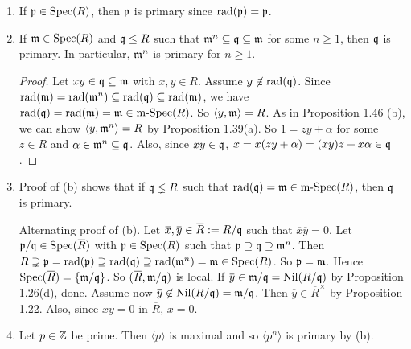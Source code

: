 \begin{example}
    \begin{enumerate}
        \item 
            If $\mathfrak{p} \in \operatorname{Spec}(R)$, then $\mathfrak{p}$ is primary since $\operatorname{rad}(\mathfrak{p}) = \mathfrak{p}$.
        \item 
            If $\mathfrak{m} \in \operatorname{Spec}(R)$ and $\mathfrak{q} \leq R$ such that $\mathfrak{m}^{n} \subseteq \mathfrak{q} \subseteq \mathfrak{m}$ for some $n \geq 1$, then $\mathfrak{q}$ is primary. In particular, $\mathfrak{m}^{n}$ is primary for $n \geq 1$.
            \begin{proof}
                Let $xy \in \mathfrak{q} \subseteq \mathfrak{m}$ with $x,y \in R$. Assume $y \not\in \operatorname{rad}(\mathfrak{q})$. Since $\operatorname{rad}(\mathfrak{m}) = \operatorname{rad}(\mathfrak{m}^{n}) \subseteq \operatorname{rad}(\mathfrak{q}) \subseteq \operatorname{rad}(\mathfrak{m})$, we have $\operatorname{rad}(\mathfrak{q}) = \operatorname{rad}(\mathfrak{m}) = \mathfrak{m} \in \operatorname{m-Spec}(R)$. So $\langle y,\mathfrak{m} \rangle = R$. As in Proposition 1.46 (b), we can show $\langle y,\mathfrak{m}^{n} \rangle = R$ by Proposition 1.39(a). So $1 = zy + \alpha$ for some $z \in R$ and $\alpha \in \mathfrak{m}^{n} \subseteq \mathfrak{q}$. Also, since $xy \in \mathfrak{q}$, $x = x(zy+\alpha) = (xy)z+x\alpha \in \mathfrak{q}$. 
            \end{proof}
        \item 
            Proof of (b) shows that if $\mathfrak{q} \lneq R$ such that $\operatorname{rad}(\mathfrak{q}) = \mathfrak{m} \in \operatorname{m-Spec}(R)$, then $\mathfrak{q}$ is primary. \par 
            Alternating proof of (b). Let $\overbar{x},\overbar{y} \in \overbar{R}: = R/\ffq$ such that $\overbar{x} \overbar{y} = 0$. Let $\ffp/\ffq \in \operatorname{Spec}(\overbar{R})$ with $\mathfrak{p} \in \operatorname{Spec}(R)$ such that $\mathfrak{p} \supseteq \mathfrak{q} \supseteq \mathfrak{m}^{n}$. Then $R \supsetneq \mathfrak{p} = \operatorname{rad}(\mathfrak{p}) \supseteq \operatorname{rad}(\mathfrak{q}) \supseteq \operatorname{rad}(\mathfrak{m}^{n}) = \mathfrak{m} \in \operatorname{Spec}(R)$. So $\mathfrak{p} = \mathfrak{m}$. Hence $\operatorname{Spec}(\overbar{R}) = \{\ffm/\ffq\}$. So $(\overbar{R},\ffm/\ffq)$ is local. If $\overbar{y} \in \ffm/\ffq = \operatorname{Nil}(R/\ffq)$ by Proposition 1.26(d), done. Assume now $\overbar{y} \not \in \operatorname{Nil}(R/\ffq) = \ffm/\ffq$. Then $\overbar{y} \in \overbar{R}^{\times}$ by Proposition 1.22. Also, since $\overbar{x} \overbar{y} = 0$ in $\overbar{R}$, $\overbar{x} = 0$.
        \item Let $p \in \mathbb{Z}$ be prime. Then $\langle p \rangle$ is maximal and so $\langle p^{n} \rangle$ is primary by (b).
    \end{enumerate}
\end{example}

